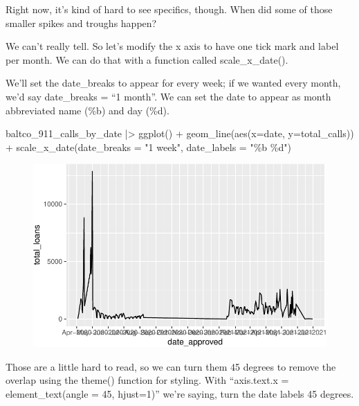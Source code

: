 \documentclass[
  letterpaper,
  DIV=11,
  numbers=noendperiod]{scrreprt}
\newenvironment{Shaded}{\begin{snugshade}}{\end{snugshade}}
\newcommand{\AttributeTok}[1]{\textcolor[rgb]{0.40,0.45,0.13}{#1}}
\newcommand{\FunctionTok}[1]{\textcolor[rgb]{0.28,0.35,0.67}{#1}}
\newcommand{\NormalTok}[1]{\textcolor[rgb]{0.00,0.23,0.31}{#1}}
\newcommand{\SpecialCharTok}[1]{\textcolor[rgb]{0.37,0.37,0.37}{#1}}
\newcommand{\StringTok}[1]{\textcolor[rgb]{0.13,0.47,0.30}{#1}}
\begin{document}
Right now, it's kind of hard to see specifics, though. When did some of
those smaller spikes and troughs happen?

We can't really tell. So let's modify the x axis to have one tick mark
and label per month. We can do that with a function called
scale\_x\_date().

We'll set the date\_breaks to appear for every week; if we wanted every
month, we'd say date\_breaks = ``1 month''. We can set the date to
appear as month abbreviated name (\%b) and day (\%d).

\begin{Shaded}
\begin{Highlighting}[]
\NormalTok{baltco\_911\_calls\_by\_date }\SpecialCharTok{|\textgreater{}}
  \FunctionTok{ggplot}\NormalTok{() }\SpecialCharTok{+} 
  \FunctionTok{geom\_line}\NormalTok{(}\FunctionTok{aes}\NormalTok{(}\AttributeTok{x=}\NormalTok{date, }\AttributeTok{y=}\NormalTok{total\_calls)) }\SpecialCharTok{+} 
  \FunctionTok{scale\_x\_date}\NormalTok{(}\AttributeTok{date\_breaks =} \StringTok{"1 week"}\NormalTok{, }\AttributeTok{date\_labels =} \StringTok{"\%b \%d"}\NormalTok{)}
\end{Highlighting}
\end{Shaded}

\begin{figure}[H]

{\centering \includegraphics{./visualizing-for-reporting_files/figure-pdf/unnamed-chunk-14-1.pdf}

}

\end{figure}

Those are a little hard to read, so we can turn them 45 degrees to
remove the overlap using the theme() function for styling. With
``axis.text.x = element\_text(angle = 45, hjust=1)'' we're saying, turn
the date labels 45 degrees.
\end{document}
